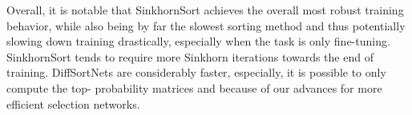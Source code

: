\documentclass{article}
\begin{document}
\begin{table}[t]
Overall, it is notable that SinkhornSort achieves the overall most robust training behavior, while also being by far the slowest sorting method and thus potentially slowing down training drastically, especially when the task is only fine-tuning.
SinkhornSort tends to require more Sinkhorn iterations towards the end of training.
DiffSortNets are considerably faster, especially, it is possible to only compute the top- probability matrices and because of our advances for more efficient selection networks.







\begin{table}[t]
    \centering
    \addtolength{\tabcolsep}{-4pt}  
    \addtolength{\tabcolsep}{4pt}  
    \vspace*{-.5em}
    \caption{
        ImageNet-1K and ImageNet-21K-P results for different distributions  for fine-tuning the head of ResNeXt-101 32x48d WSL \citep{mahajan2018exploring}.
        The metrics are Top-Top- accuracy averaged over 10 seeds for ImageNet-1K and 2 seeds for ImageNet-21K-P.
    }
    \label{tab:imagenet-different-PK}
    \vspace*{-1em}
\end{table}









\end{table}
\end{document}
